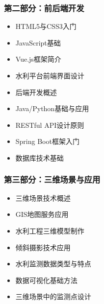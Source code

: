 \hypertarget{ux7b2cux4e8cux90e8ux5206ux524dux540eux7aefux5f00ux53d1-1}{%
\subsubsection{第二部分：前后端开发}\label{ux7b2cux4e8cux90e8ux5206ux524dux540eux7aefux5f00ux53d1-1}}


\begin{itemize}
\tightlist
\item
  HTML5与CSS3入门
\item
  JavaScript基础
\item
  Vue.js框架简介
\item
  水利平台前端界面设计
\end{itemize}


\begin{itemize}
\tightlist
\item
  后端开发概述
\item
  Java/Python基础与应用
\item
  RESTful API设计原则
\item
  Spring Boot框架入门
\item
  数据库技术基础
\end{itemize}

\hypertarget{ux7b2cux4e09ux90e8ux5206ux4e09ux7ef4ux573aux666fux4e0eux5e94ux7528-1}{%
\subsubsection{第三部分：三维场景与应用}\label{ux7b2cux4e09ux90e8ux5206ux4e09ux7ef4ux573aux666fux4e0eux5e94ux7528-1}}


\begin{itemize}
\tightlist
\item
  三维场景技术概述
\item
  GIS地图服务应用
\item
  水利工程三维模型制作
\item
  倾斜摄影技术应用
\end{itemize}


\begin{itemize}
\tightlist
\item
  水利监测数据类型与特点
\item
  数据可视化基础方法
\item
  三维场景中的监测点设计
\end{itemize}

